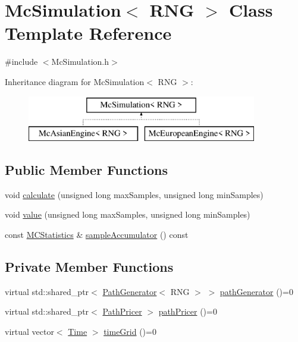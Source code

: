 \hypertarget{class_mc_simulation}{}\section{Mc\+Simulation$<$ R\+NG $>$ Class Template Reference}
\label{class_mc_simulation}


{\ttfamily \#include $<$Mc\+Simulation.\+h$>$}

Inheritance diagram for Mc\+Simulation$<$ R\+NG $>$\+:\begin{figure}[H]
\begin{center}
\leavevmode
\includegraphics[height=2.000000cm]{class_mc_simulation}
\end{center}
\end{figure}
\subsection*{Public Member Functions}
\begin{DoxyCompactItemize}
\item 
void \hyperlink{class_mc_simulation_acaa09060a9ee90e0cc3631d8b30ebae0}{calculate} (unsigned long max\+Samples, unsigned long min\+Samples)
\item 
void \hyperlink{class_mc_simulation_a476b6d633c6ebb742d6d26a62a6a3810}{value} (unsigned long max\+Samples, unsigned long min\+Samples)
\item 
const \hyperlink{class_m_c_statistics}{M\+C\+Statistics} \& \hyperlink{class_mc_simulation_ae806933e305840081ef1554ad17012c3}{sample\+Accumulator} () const
\end{DoxyCompactItemize}
\subsection*{Private Member Functions}
\begin{DoxyCompactItemize}
\item 
virtual std\+::shared\+\_\+ptr$<$ \hyperlink{class_path_generator}{Path\+Generator}$<$ R\+NG $>$ $>$ \hyperlink{class_mc_simulation_a44086a1efd452d8644c9f2e52417038f}{path\+Generator} ()=0
\item 
virtual std\+::shared\+\_\+ptr$<$ \hyperlink{class_path_pricer}{Path\+Pricer} $>$ \hyperlink{class_mc_simulation_ae3b894a78823df7897abf418bb04a4a1}{path\+Pricer} ()=0
\item 
virtual vector$<$ \hyperlink{_name_def_8h_ac2d3e0ba793497bcca555c7c2cf64ff3}{Time} $>$ \hyperlink{class_mc_simulation_ac3c90184d3d97fc7c01c974ad861f8d9}{time\+Grid} ()=0
\end{DoxyCompactItemize}

